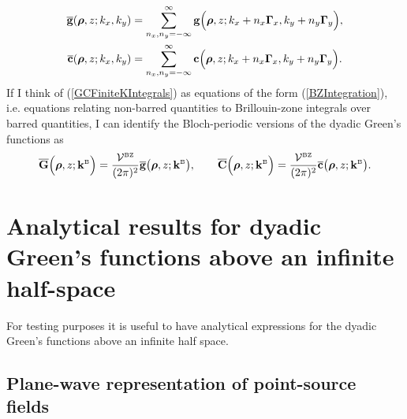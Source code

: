 \documentclass[letterpaper]{article}
\newcommand{\vbGamma}{\boldsymbol{\Gamma}}
\begin{document}
\begin{align*}
 \overline{\vb g}(\vbrho, z; k_x, k_y)
 &= \sum_{n_x, n_y=-\infty}^{\infty}
     \vb g\Big(\vbrho, z; k_x + n_x\vbGamma_x, k_y + n_y \vbGamma_y\Big), 
\\
 \overline{\vb c}(\vbrho, z; k_x, k_y) 
 &= \sum_{n_x, n_y=-\infty}^{\infty}
     \vb c\Big(\vbrho, z; k_x + n_x\vbGamma_x, k_y + n_y \vbGamma_y\Big).
\end{align*}
If I think of (\ref{GCFiniteKIntegrals}) as equations of the form
(\ref{BZIntegration}), i.e. equations relating non-barred quantities
to Brillouin-zone integrals over barred quantities, I can
identify the Bloch-periodic versions of the dyadic Green's functions
as 
$$
\overline{\mathbf{G}}\Big(\boldsymbol{\rho}, z; \mathbf{k}^{\hbox{\tiny{B}}}\Big)
=\frac{\mathcal{V}^{\hbox{\tiny{BZ}}}}{(2\pi)^2}
  \overline{\mathbf{g}}\big(\boldsymbol{\rho}, z; \mathbf{k}^{\hbox{\tiny{B}}}\big), 
\qquad
\overline{\mathbf{C}}\Big(\boldsymbol{\rho}, z; \mathbf{k}^{\hbox{\tiny{B}}}\Big)
=\frac{\mathcal{V}^{\hbox{\tiny{BZ}}}}{(2\pi)^2}
  \overline{\mathbf{c}}\big(\boldsymbol{\rho}, z; \mathbf{k}^{\hbox{\tiny{B}}}\big).
$$

\newpage
\section{Analytical results for dyadic Green's functions above an 
         infinite half-space}

For testing purposes it is useful to have analytical expressions
for the dyadic Green's functions above an infinite half space.

\subsection*{Plane-wave representation of point-source fields}
\end{document}

